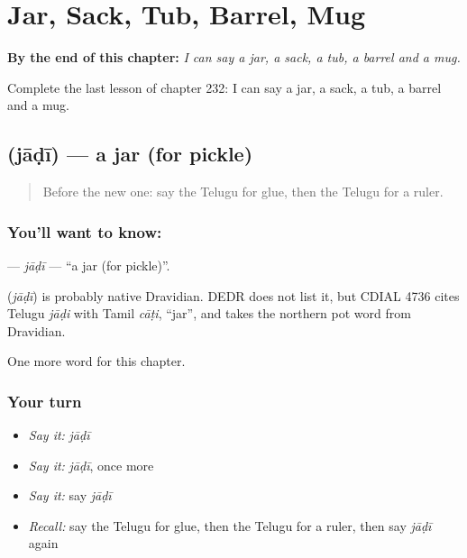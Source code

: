 
\chapter{Jar, Sack, Tub, Barrel, Mug}
\label{ch:te-jar-sack-tub-barrel-mug}

\begin{chapteropening}
\textbf{By the end of this chapter:} \emph{I can say a jar, a sack, a tub, a barrel and a mug.}

Complete the last lesson of chapter 232: I can say a jar, a sack, a tub, a barrel and a mug.
\end{chapteropening}

\section[\texorpdfstring{\te{జాడీ} (jāḍī)}{జాడీ (jāḍī)}]{ (jāḍī) — a jar (for pickle)}

\label{lesson:TE-C232-jadi}



\begin{quote}
Before the new one: say the Telugu for glue, then the Telugu for a ruler.
\end{quote}

\subsection*{You'll want to know: }
\textbf{} — \emph{jāḍī} — \textquotedblleft{}a jar (for pickle)\textquotedblright{}.

\begin{cousinweb}
\textbf{} (\emph{jāḍī}) is probably native Dravidian. DEDR does not list it, but CDIAL 4736 cites Telugu \emph{jāḍi} with Tamil \emph{cāṭi}, \textquotedblleft{}jar\textquotedblright{}, and takes the northern pot word from Dravidian.
\end{cousinweb}

\begin{grammarlens}[title={What you've built}]
One more word for this chapter.
\end{grammarlens}

\subsection*{Your turn}
\begin{itemize}
\raggedright
  \item \emph{Say it:} \emph{jāḍī}
  \item \emph{Say it:} \emph{jāḍī}, once more
  \item \emph{Say it:} say \emph{jāḍī}
  \item \emph{Recall:} say the Telugu for glue, then the Telugu for a ruler, then say \emph{jāḍī} again
\end{itemize}


